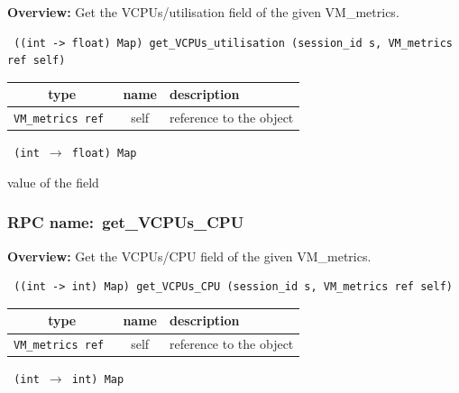 {\bf Overview:} 
Get the VCPUs/utilisation field of the given VM\_metrics.

\begin{verbatim} ((int -> float) Map) get_VCPUs_utilisation (session_id s, VM_metrics ref self)\end{verbatim}



 
\vspace{0.3cm}
\begin{tabular}{|c|c|p{7cm}|}
 \hline
{\bf type} & {\bf name} & {\bf description} \\ \hline
{\tt VM\_metrics ref } & self & reference to the object \\ \hline 

\end{tabular}

\vspace{0.3cm}

{\tt 
(int $\rightarrow$ float) Map
}


value of the field
\vspace{0.3cm}
\vspace{0.3cm}
\vspace{0.3cm}
\subsubsection{RPC name:~get\_VCPUs\_CPU}

{\bf Overview:} 
Get the VCPUs/CPU field of the given VM\_metrics.

\begin{verbatim} ((int -> int) Map) get_VCPUs_CPU (session_id s, VM_metrics ref self)\end{verbatim}



 
\vspace{0.3cm}
\begin{tabular}{|c|c|p{7cm}|}
 \hline
{\bf type} & {\bf name} & {\bf description} \\ \hline
{\tt VM\_metrics ref } & self & reference to the object \\ \hline 

\end{tabular}

\vspace{0.3cm}

{\tt 
(int $\rightarrow$ int) Map
}


